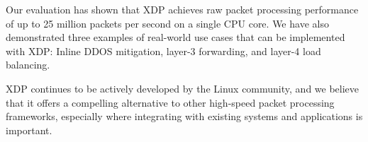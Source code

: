 \documentclass[10pt,sigconf]{acmart}
\begin{document}
Our evaluation has shown that XDP achieves raw packet processing performance of
up to 25 million packets per second on a single CPU core. We have also
demonstrated three examples of real-world use cases that can be implemented with
XDP: Inline DDOS mitigation, layer-3 forwarding, and layer-4 load balancing.

XDP continues to be actively developed by the Linux community, and we believe
that it offers a compelling alternative to other high-speed packet processing
frameworks, especially where integrating with existing systems and applications
is important.



\end{document}
